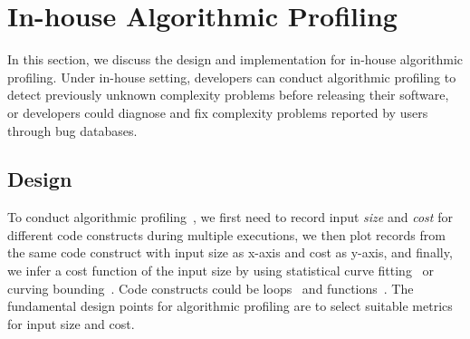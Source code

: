 \section{In-house Algorithmic Profiling}
\label{sec:inhouse}

In this section, we discuss the design and implementation for in-house algorithmic profiling.
Under in-house setting, 
developers can conduct algorithmic profiling 
to detect previously unknown complexity problems before releasing their software, 
or developers could diagnose and fix complexity problems 
reported by users through bug databases.


\subsection{Design}
To conduct algorithmic profiling~\cite{Aprof1,Aprof2,AlgoProf},
we first need to record input \textit{size} and \textit{cost} for different code constructs 
during multiple executions,
we then plot records from the same code construct with input size as x-axis and cost as y-axis, 
and finally, we infer a cost function of the input size by using 
statistical curve fitting~\cite{curve-fitting} 
or curving bounding~\cite{curve-bounding}. 
Code constructs could be loops~\cite{AlgoProf} and functions~\cite{Aprof1,Aprof2}. 
The fundamental design points for algorithmic 
profiling are to select suitable metrics for input size and cost. 

